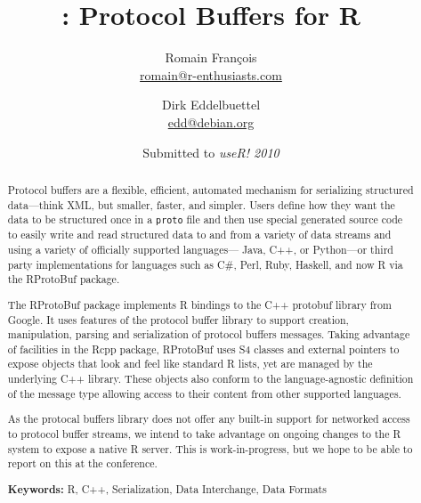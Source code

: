 \documentclass[11pt]{article}
\author{
  Romain Fran\c{c}ois\\ {\small \url{romain@r-enthusiasts.com} } \and
  Dirk Eddelbuettel\\ {\small \url{edd@debian.org} }
}
\title{\pkg{RProtoBuf}: Protocol Buffers for R }
\date{Submitted to \textsl{useR! 2010}}
\newcommand{\proglang}[1]{\textsf{#1}}
\newcommand{\pkg}[1]{{\fontseries{b}\selectfont #1}}
\begin{document}
\maketitle
\thispagestyle{empty}
\begin{abstract}
  \addtolength{\parskip}{\baselineskip} 	%
  \noindent %
  Protocol buffers are a flexible, efficient, automated mechanism for
  serializing structured data---think XML, but smaller, faster, and simpler.
  Users define how they want the data to be structured once in a
  \texttt{proto} file and then use special generated source code to easily
  write and read structured data to and from a variety of data streams and
  using a variety of officially supported languages--- \proglang{Java},
  \proglang{C++}, or \proglang{Python}---or third party implementations for
  languages such as \proglang{C\#}, \proglang{Perl}, \proglang{Ruby},
  \proglang{Haskell}, and now \proglang{R} via the \pkg{RProtoBuf} package.
  
  The \pkg{RProtoBuf} package implements \proglang{R} bindings to the
  \proglang{C++} protobuf library from Google. It uses features of the
  protocol buffer library to support creation, manipulation, parsing and
  serialization of protocol buffers messages. Taking advantage of facilities
  in the \pkg{Rcpp} package, \pkg{RProtoBuf} uses S4 classes and external
  pointers to expose objects that look and feel like standard \proglang{R}
  lists, yet are managed by the underlying C++ library. These objects also
  conform to the language-agnostic definition of the message type allowing
  access to their content from other supported languages.

  As the protocal buffers library does not offer any built-in support
  for networked access to protocol buffer streams, we intend to take
  advantage on ongoing changes to the \proglang{R} system to expose a native
  \proglang{R} server. This is work-in-progress, but we hope to be able to
  report on this at the conference.

  \noindent \textbf{Keywords:}  
  \proglang{R}, \proglang{C++}, Serialization, Data Interchange, Data Formats
\end{abstract}
\end{document}
